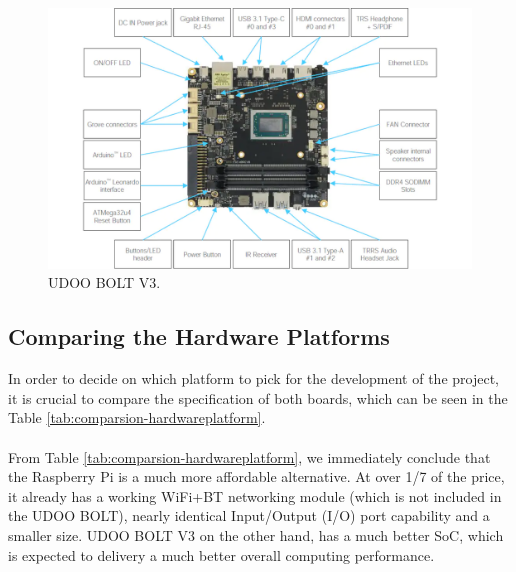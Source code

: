 \begin{figure}[H]
    \centering
    \includegraphics[width=\linewidth]{images/UDOO_BOLT_GEAR_BLT.png}
    \caption{UDOO BOLT V3.}
    \label{fig:udoobolt-image}
\end{figure}

\subsection{Comparing the Hardware Platforms}

In order to decide on which platform to pick for the development of the project, it is crucial to compare the specification of both boards, which can be seen in the Table \ref{tab:comparsion-hardwareplatform}.

\paragraph{} From Table \ref{tab:comparsion-hardwareplatform}, we immediately conclude that the Raspberry Pi is a much more affordable alternative. At over 1/7 of the price, it already has a working WiFi+BT networking module (which is not included in the UDOO BOLT), nearly identical Input/Output (I/O) port capability and a smaller size. UDOO BOLT V3 on the other hand, has a much better SoC, which is expected to delivery a much better overall computing performance.

